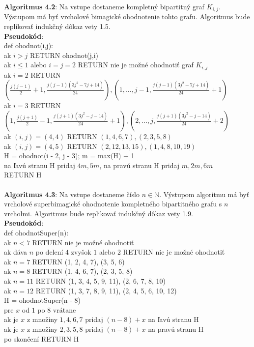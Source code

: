\documentclass[12pt]{article}
\begin{document}
\textbf{Algoritmus 4.2}: Na vstupe dostaneme kompletný bipartitný graf $K_{i,j}$. Výstupom má byť vrcholové bimagické ohodnotenie tohto grafu. Algoritmus bude replikovať indukčný dôkaz vety 1.5. \\

\textbf{Pseudokód}: \\
def ohodnot(i,j): \\
ak $i > j$ RETURN ohodnot(j,i) \\
ak $i \leq 1$ alebo $i = j = 2$ RETURN nie je možné ohodnotiť graf $K_{i,j}$ \\
ak $i = 2$ RETURN $(\frac{j(j-1)}{2} + 1, \frac{j(j-1)(3j^2-7j+14)}{24}), (1, ... , j-1, \frac{j(j-1)(3j^2-7j+14)}{24} + 1)$ \\
ak $i = 3$ RETURN $(1, \frac{j(j+1)}{2} - 1, \frac{j(j+1)(3j^2-j-14)}{24} + 1), (2, ... , j, \frac{j(j+1)(3j^2-j-14)}{24} + 2)$ \\
ak $(i, j) = (4,4)$ RETURN $(1, 4, 6, 7), (2, 3, 5, 8)$ \\
ak $(i, j) = (4,5)$ RETURN $(2, 12, 13, 15), (1, 4, 8, 10, 19)$ \\
H = ohodnot(i - 2, j - 3); m = max(H) + 1 \\
na ľavú stranu H pridaj $4m, 5m$, na pravú stranu H pridaj $m, 2m, 6m$ \\
RETURN H \\\\

\textbf{Algoritmus 4.3}: Na vstupe dostaneme číslo $n \in \mathbb{N}$. Výstupom algoritmu má byť vrcholové superbimagické ohodnotenie kompletného bipartitného grafu s $n$ vrcholmi. Algoritmus bude replikovať indukčný dôkaz vety 1.9. \\

\textbf{Pseudokód}: \\
def ohodnotSuper(n): \\
ak $n < 7$ RETURN nie je možné ohodnotiť \\
ak dáva $n$ po delení $4$ zvyšok $1$ alebo $2$ RETURN nie je možné ohodnotiť \\
ak $n = 7$ RETURN (1, 2, 4, 7), (3, 5, 6) \\
ak $n = 8$ RETURN (1, 4, 6, 7), (2, 3, 5, 8) \\
ak $n = 11$ RETURN (1, 3, 4, 5, 9, 11), (2, 6, 7, 8, 10) \\
ak $n = 12$ RETURN (1, 3, 7, 8, 9, 11), (2, 4, 5, 6, 10, 12) \\
H = ohodnotSuper(n - 8) \\
pre $x$ od $1$ po $8$ vrátane \\
ak je $x$ z množiny $1, 4, 6, 7$ pridaj $(n-8)+x$ na ľavú stranu H \\
ak je $x$ z množiny $2, 3, 5, 8$ pridaj $(n-8)+x$ na pravú stranu H \\
po skončení RETURN H \\\\
\end{document}
